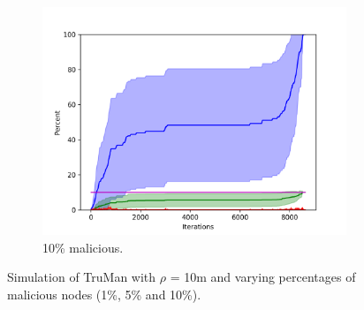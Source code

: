 \begin{figure}
\centering
\begin{subfigure}{0.5\textwidth}
\includegraphics[width=\linewidth]{images/plots/Network_rA/10_10.png}
\caption{10\% malicious.}
\end{subfigure}

\caption{Simulation of TruMan with $\rho$ = 10m and varying percentages of malicious nodes (1\%, 5\% and 10\%).}
\label{fig:randommalicious1}
\end{figure}

